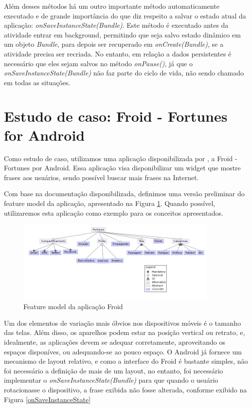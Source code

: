 Além desses métodos há um outro importante método automaticamente executado e de 
grande importância do que diz respeito a salvar o estado atual da aplicação: 
{\it onSaveInstanceState(Bundle)}. Este método é executado antes da atividade entrar em 
background, permitindo que seja salvo estado dinâmico em um objeto {\it Bundle}, para depois 
ser recuperado em {\it onCreate(Bundle)}, se a atividade precisa ser recriada. No entanto,
em relação a dados persistentes é necessário que eles sejam salvos no método {\it onPause()}, 
já que o {\it onSaveInstanceState(Bundle)} não faz parte do ciclo de vida, não sendo chamado 
em todas as situações.

\section{Estudo de caso: Froid - Fortunes for Android}

Como estudo de caso, utilizamos uma aplicação disponibilizada por \cite{abp}, a 
Froid - Fortunes por Android. Essa aplicação visa disponibilizar um widget que 
mostre frases aos usuários, sendo possível buscar mais frases na Internet. 

Com base na documentação disponibilizada, definimos uma versão preliminar do feature 
model da aplicação, apresentado na Figura \ref{fortunes_fm}. Quando possível, utilizaremos
esta aplicação como exemplo para os conceitos apresentados.

\begin{figure}[h]
    \centering
    \includegraphics[width=10cm]{img/fortunes_fm}
    \caption{Feature model da aplicação Froid}
    \label{fortunes_fm}
\end{figure}



Um dos elementos de variação mais óbvios nos dispositivos móveis é o tamanho das telas.
Além disso, os aparelhos podem estar na posição vertical ou retrato, e, idealmente, 
as aplicações devem se adequar corretamente, aproveitando os espaços disponíves, ou 
adequando-se ao pouco espaço. O Android já fornece um mecanismo de layout relativo,
e como a interface do Froid é bastante simples, não foi necessário a definição de 
mais de um layout, no entanto, foi necessário implementar o {\it onSaveInstanceState(Bundle)}
para que quando o usuário rotacionasse o dispositivo, a frase exibida não fosse alterada, 
conforme exibido na Figura \ref{onSaveInstanceState}

